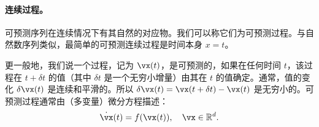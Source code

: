 \documentclass[../../book-main_zh.tex]{subfiles}
\begin{document}

\paragraph{连续过程。}
可预测序列在连续情况下有其自然的对应物。我们可以称它们为可预测过程。与自然数序列类似，最简单的可预测连续过程是时间本身 $x=t$。

更一般地，我们说一个过程，记为 $\vx(t)$，是可预测的，如果在任何时间 $t$，该过程在 $t+\delta t$ 的值（其中 $\delta t$ 是一个无穷小增量）由其在 $t$ 的值确定。通常，值的变化 $\delta \vx(t)$ 是连续和平滑的。所以 $\delta \vx(t) = \vx(t + \delta t) - \vx(t)$ 是无穷小的。可预测过程通常由（多变量）微分方程描述：
\begin{equation}
    \dot{\vx}(t) = f(\vx(t)), \quad \vx \in \mathbb{R}^d. 
    \label{eqn:process}
\end{equation}
\end{document}
